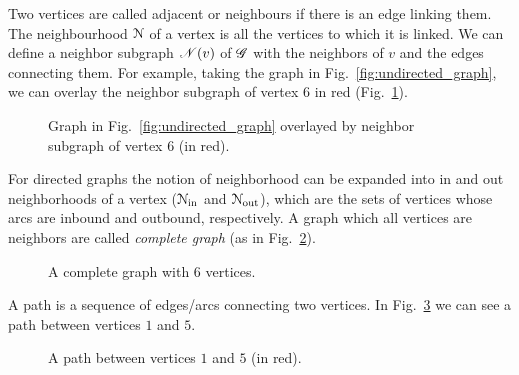 \documentclass[../main.tex]{subfiles}
\begin{document}
Two vertices are called adjacent or neighbours if there is an edge linking them.
The neighbourhood $\mathcal{N}$ of a vertex is all the vertices to which it is linked.
We can define a neighbor subgraph $\mathscr{N}(v)$ of $\mathscr{G}$ with the neighbors of $v$ and the edges connecting them. For example, taking the graph in Fig.~\ref{fig:undirected_graph}, we can overlay the neighbor subgraph of vertex $6$ in red (Fig.~\ref{fig:neighbor_subgraph}).


\begin{figure}[h]
  \centering
  \caption{Graph in Fig.~\ref{fig:undirected_graph} overlayed by neighbor subgraph of vertex $6$ (in red).}\label{fig:neighbor_subgraph}
\end{figure}

For directed graphs the notion of neighborhood can be expanded into in and out neighborhoods of a vertex ($\mathcal{N}_{\text{in}}$ and $\mathcal{N}_{\text{out}}$), which are the sets of vertices whose arcs are inbound and outbound, respectively.
A graph which all vertices are neighbors are called \emph{complete graph} (as in Fig.~\ref{fig:complete_graph}).

\begin{figure}[h]
    \centering
    \caption{A complete graph with 6 vertices.}\label{fig:complete_graph}
\end{figure}

A path is a sequence of edges/arcs connecting two vertices. In Fig.~\ref{fig:a_path} we can see a path between vertices $1$ and $5$.

\begin{figure}[h]
  \centering
  \caption{A path between vertices $1$ and $5$ (in red).}\label{fig:a_path}
\end{figure}
\end{document}
